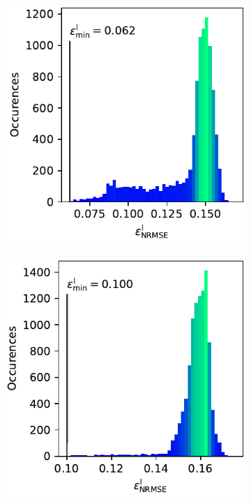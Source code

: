 \documentclass[
  a4paper,  %
  twoside,  %
  bibliography=totoc,
  headsepline,
  cleardoublepage=empty,
  parskip=half,
  draft=false
]{scrbook}
\begin{document}
\begin{mdframed}[style=style]
\begin{figure}[H]
\begin{subfigure}{.5\textwidth}
  \centering
   \includegraphics[width=0.95\linewidth]{graphics/ishigami_hist_2}
\vspace{3mm}
\label{fig:ishigami_hist_2}
\end{subfigure}%
\begin{subfigure}{.5\textwidth}
  \centering
   \includegraphics[width=0.95\linewidth]{graphics/ishigami_hist_1}

\end{subfigure}
\end{figure}
\end{mdframed}
\end{document}
